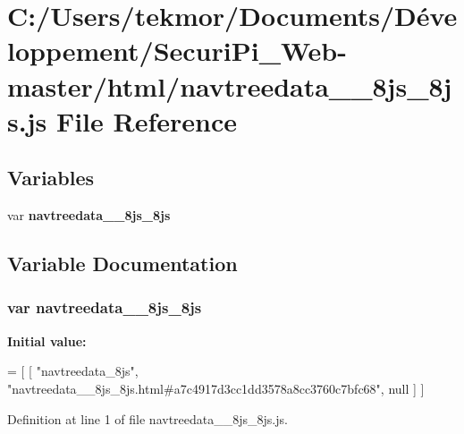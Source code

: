 \section{C\+:/\+Users/tekmor/\+Documents/\+Développement/\+Securi\+Pi\+\_\+\+Web-\/master/html/navtreedata\+\_\+\+\_\+8js\+\_\+8js.js File Reference}
\label{navtreedata____8js__8js_8js}
\subsection*{Variables}
\begin{DoxyCompactItemize}
\item 
var {\bf navtreedata\+\_\+\+\_\+8js\+\_\+8js}
\end{DoxyCompactItemize}


\subsection{Variable Documentation}
\subsubsection[{navtreedata\+\_\+\+\_\+8js\+\_\+8js}]{\setlength{\rightskip}{0pt plus 5cm}var navtreedata\+\_\+\+\_\+8js\+\_\+8js}\label{navtreedata____8js__8js_8js_a998d76341d7a2659e58b018ab17ed228}
{\bfseries Initial value\+:}
\begin{DoxyCode}
=
[
    [ \textcolor{stringliteral}{"navtreedata\_8js"}, \textcolor{stringliteral}{"navtreedata\_\_8js\_8js.html#a7c4917d3cc1dd3578a8cc3760c7bfc68"}, null ]
]
\end{DoxyCode}


Definition at line 1 of file navtreedata\+\_\+\+\_\+8js\+\_\+8js.\+js.

